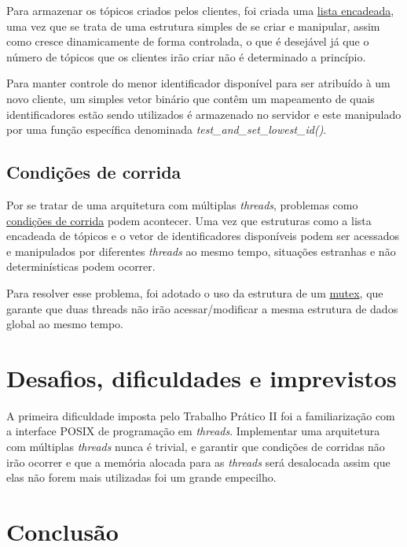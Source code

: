 \documentclass{article}
\begin{document}
Para armazenar os tópicos criados pelos clientes, foi criada uma
\href{https://en.wikipedia.org/wiki/Linked_list}{lista encadeada}, uma vez que
se trata de uma estrutura simples
de se criar e manipular, assim como cresce dinamicamente de forma controlada, o
que é desejável já que o número de tópicos que os clientes irão criar não é
determinado a princípio.

Para manter controle do menor identificador disponível para ser atribuído à um
novo cliente, um simples vetor binário que contêm um mapeamento de quais
identificadores estão sendo utilizados
é armazenado no servidor e este manipulado por uma função específica
denominada \textit{test\_and\_set\_lowest\_id()}.

\subsection{Condições de corrida}

Por se tratar de uma arquitetura com múltiplas \textit{threads}, problemas
como
\href{https://learn.microsoft.com/en-us/troubleshoot/developer/visualstudio/visual-basic/language-compilers/race-conditions-deadlocks}{condições
      de corrida}
podem acontecer. Uma vez que estruturas como a lista encadeada de tópicos e o
vetor de identificadores disponíveis
podem ser acessados e manipulados por diferentes \textit{threads} ao mesmo
tempo, situações estranhas e não determinísticas podem ocorrer.

Para resolver esse problema, foi adotado o uso da estrutura de um
\href{https://www.ibm.com/docs/pt-br/aix/7.3?topic=programming-using-mutexes}{mutex},
que garante que duas threads não irão acessar/modificar a mesma estrutura de
dados global
ao mesmo tempo.

\section{Desafios, dificuldades e imprevistos}

A primeira dificuldade imposta pelo Trabalho Prático II foi a familiarização
com a
interface POSIX de programação em \textit{threads}. Implementar uma arquitetura
com múltiplas \textit{threads}
nunca é trivial, e garantir que condições de corridas não irão ocorrer e que a
memória alocada para as \textit{threads} será desalocada assim que elas não
forem mais utilizadas foi um grande empecilho.

\section{Conclusão}
\end{document}
